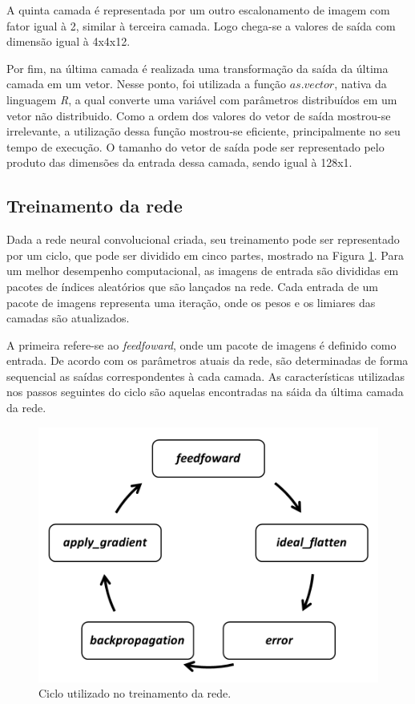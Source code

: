 \documentclass[conference]{IEEEtran}
\begin{document}
A quinta camada é representada por um outro escalonamento de imagem com fator igual à 2, similar à terceira camada. Logo chega-se a valores de saída com dimensão igual à 4x4x12.

Por fim, na última camada é realizada uma transformação da saída da última camada em um vetor. Nesse ponto, foi utilizada a função $as.vector$, nativa da linguagem \textit{R}, a qual converte uma variável com parâmetros distribuídos em um vetor não distribuido. Como a ordem dos valores do vetor de saída mostrou-se irrelevante, a utilização dessa função mostrou-se eficiente, principalmente no seu tempo de execução. O tamanho do vetor de saída pode ser representado pelo produto das dimensões da entrada dessa camada, sendo igual à 128x1.



\subsection{Treinamento da rede} \label{metod:train}

Dada a rede neural convolucional criada, seu treinamento pode ser representado por um ciclo, que pode ser dividido em cinco partes, mostrado na Figura \ref{figcycle}. Para um melhor desempenho computacional, as imagens de entrada são divididas em pacotes de índices aleatórios que são lançados na rede. Cada entrada de um pacote de imagens representa uma iteração, onde os pesos e os limiares das camadas são atualizados.

A primeira refere-se ao \textit{feedfoward}, onde um pacote de imagens é definido como entrada. De acordo com os parâmetros atuais da rede, são determinadas de forma sequencial as saídas correspondentes à cada camada. As características utilizadas nos passos seguintes do ciclo são aquelas encontradas na sáida da última camada da rede.

\begin{figure}[b]
\centerline{\includegraphics[width=.6\columnwidth]{fig/cycle.png}}
\caption{Ciclo utilizado no treinamento da rede.}
\label{figcycle}
\end{figure}
\end{document}
